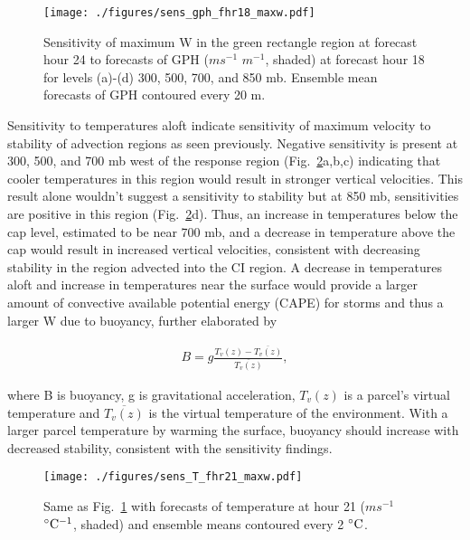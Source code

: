 \documentclass{ttuthes2007}
\newcommand{\tab}{\hspace*{2em}}  %
\begin{document}
\begin{figure}[!tb]
  \centering
  \noindent\texttt{[image: ./figures/sens\_gph\_fhr18\_maxw.pdf]}\\
  \caption{Sensitivity of maximum W in the green rectangle region at forecast hour 24 to forecasts of GPH ($m s^{-1}$ $m^{-1}$, shaded) at forecast hour 18 for levels (a)-(d) 300, 500, 700, and 850 mb. Ensemble mean forecasts of GPH contoured every 20 m.}
\label{sens_gph_fhr18_maxw}
\end{figure}

\tab Sensitivity to temperatures aloft indicate sensitivity of maximum velocity to stability of advection regions as seen previously. Negative sensitivity is present at 300, 500, and 700 mb west of the response region (Fig.~\ref{sens_T_fhr21_maxw}a,b,c) indicating that cooler temperatures in this region would result in stronger vertical velocities. This result alone wouldn't suggest a sensitivity to stability but at 850 mb, sensitivities are positive in this region (Fig.~\ref{sens_T_fhr21_maxw}d). Thus, an increase in temperatures below the cap level, estimated to be near 700 mb, and a decrease in temperature above the cap would result in increased vertical velocities, consistent with decreasing stability in the region advected into the CI region. A decrease in temperatures aloft and increase in temperatures near the surface would provide a larger amount of convective available potential energy (CAPE) for storms and thus a larger W due to buoyancy, further elaborated by

\begin{align}
B = g \frac{T_v (z) - \overline{T_v (z)}}{ \overline{T_v (z)}},
\end{align}

where B is buoyancy, g is gravitational acceleration, $T_v (z)$ is a parcel's virtual temperature and $\overline{T_v (z)}$ is the virtual temperature of the environment. With a larger parcel temperature by warming the surface, buoyancy should increase with decreased stability, consistent with the sensitivity findings. 

\begin{figure}[!tb]
  \centering
  \noindent\texttt{[image: ./figures/sens\_T\_fhr21\_maxw.pdf]}\\
  \caption{Same as Fig.~\ref{sens_gph_fhr18_maxw} with forecasts of temperature at hour 21 ($m s^{-1}$ ${}^{\circ} {\rm C^{-1}}$, shaded) and ensemble means contoured every 2 ${}^{\circ} {\rm C}$.}
\label{sens_T_fhr21_maxw}
\end{figure}
\end{document}
